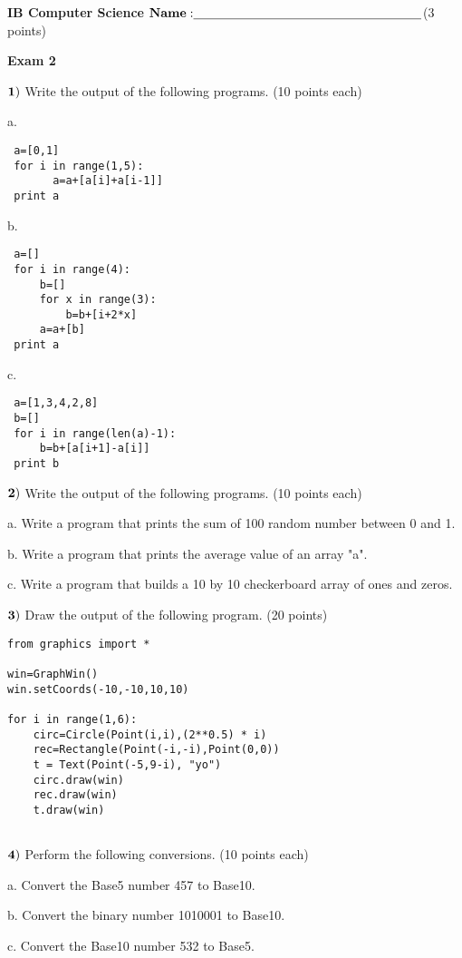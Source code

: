 \documentclass{article}
\begin{document}

\doublespacing
\textbf{IB Computer Science }                        %
 \hfill                             %
$ {\bf Name: } \underline{\hspace{2.5in}}$(3 points)

\begin{centering}
\vspace{1cm}
\textbf{Exam 2}\\
\end{centering}
\vspace{1cm}
 

  
 $\bf{1)}$ Write the output of the following programs. (10 points each)
 
 \vspace{1cm}

  
 a.   \begin{verbatim}
 a=[0,1]
 for i in range(1,5):
       a=a+[a[i]+a[i-1]]
 print a
 \end{verbatim}
 \vspace{1cm}
 
 b.  \begin{verbatim}
 a=[]
 for i in range(4):
     b=[]
     for x in range(3):
         b=b+[i+2*x]
     a=a+[b]
 print a
 \end{verbatim}
 \vspace{1cm}
 
 c.  \begin{verbatim}
 a=[1,3,4,2,8]
 b=[]
 for i in range(len(a)-1):
     b=b+[a[i+1]-a[i]]
 print b
 \end{verbatim}
 
  \newpage
  
  $\bf{2)}$ Write the output of the following programs. (10 points each)
  
  a.  Write a program that prints the sum of 100 random number between 0 and 1. 
  
  b.  Write a program that prints the average value of an array "a". 
  
  c.  Write a program that builds a 10 by 10 checkerboard array of ones and zeros.

  
  
  
    \newpage
  
  $\bf{3)}$  Draw the output of the following program. (20 points)
  \begin{verbatim}
from graphics import *

win=GraphWin()
win.setCoords(-10,-10,10,10)

for i in range(1,6):
    circ=Circle(Point(i,i),(2**0.5) * i)
    rec=Rectangle(Point(-i,-i),Point(0,0))
    t = Text(Point(-5,9-i), "yo")
    circ.draw(win)
    rec.draw(win)
    t.draw(win)
    
    \end{verbatim}
    
   
  \newpage
  
  $\bf{4)}$ Perform the following conversions. (10 points each)
  \vspace{0.5cm}
  
   a. Convert the Base5 number 457 to Base10. 
  
  b. Convert the binary number 1010001 to Base10. 
  
  c. Convert the Base10 number 532 to Base5.
  
  

 
\end{document}
